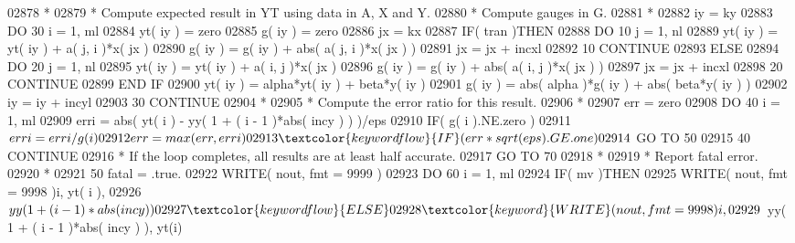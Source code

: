 \begin{DoxyCode}
02878 \textcolor{comment}{*}
02879 \textcolor{comment}{*     Compute expected result in YT using data in A, X and Y.}
02880 \textcolor{comment}{*     Compute gauges in G.}
02881 \textcolor{comment}{*}
02882       iy = ky
02883       \textcolor{keywordflow}{DO} 30 i = 1, ml
02884          yt( iy ) = zero
02885          g( iy ) = zero
02886          jx = kx
02887          \textcolor{keywordflow}{IF}( tran )\textcolor{keywordflow}{THEN}
02888             \textcolor{keywordflow}{DO} 10 j = 1, nl
02889                yt( iy ) = yt( iy ) + a( j, i )*x( jx )
02890                g( iy ) = g( iy ) + abs( a( j, i )*x( jx ) )
02891                jx = jx + incxl
02892    10       \textcolor{keywordflow}{CONTINUE}
02893          \textcolor{keywordflow}{ELSE}
02894             \textcolor{keywordflow}{DO} 20 j = 1, nl
02895                yt( iy ) = yt( iy ) + a( i, j )*x( jx )
02896                g( iy ) = g( iy ) + abs( a( i, j )*x( jx ) )
02897                jx = jx + incxl
02898    20       \textcolor{keywordflow}{CONTINUE}
02899 \textcolor{keywordflow}{         END IF}
02900          yt( iy ) = alpha*yt( iy ) + beta*y( iy )
02901          g( iy ) = abs( alpha )*g( iy ) + abs( beta*y( iy ) )
02902          iy = iy + incyl
02903    30 \textcolor{keywordflow}{CONTINUE}
02904 \textcolor{comment}{*}
02905 \textcolor{comment}{*     Compute the error ratio for this result.}
02906 \textcolor{comment}{*}
02907       err = zero
02908       \textcolor{keywordflow}{DO} 40 i = 1, ml
02909          erri = abs( yt( i ) - yy( 1 + ( i - 1 )*abs( incy ) ) )/eps
02910          \textcolor{keywordflow}{IF}( g( i ).NE.zero )
02911      $      erri = erri/g( i )
02912          err = max( err, erri )
02913          \textcolor{keywordflow}{IF}( err*sqrt( eps ).GE.one )
02914      $      \textcolor{keywordflow}{GO TO} 50
02915    40 \textcolor{keywordflow}{CONTINUE}
02916 \textcolor{comment}{*     If the loop completes, all results are at least half accurate.}
02917       \textcolor{keywordflow}{GO TO} 70
02918 \textcolor{comment}{*}
02919 \textcolor{comment}{*     Report fatal error.}
02920 \textcolor{comment}{*}
02921    50 fatal = .true.
02922       \textcolor{keyword}{WRITE}( nout, fmt = 9999 )
02923       \textcolor{keywordflow}{DO} 60 i = 1, ml
02924          \textcolor{keywordflow}{IF}( mv )\textcolor{keywordflow}{THEN}
02925             \textcolor{keyword}{WRITE}( nout, fmt = 9998 )i, yt( i ),
02926      $         yy( 1 + ( i - 1 )*abs( incy ) )
02927          \textcolor{keywordflow}{ELSE}
02928             \textcolor{keyword}{WRITE}( nout, fmt = 9998 )i, 
02929      $         yy( 1 + ( i - 1 )*abs( incy ) ), yt(i)

\end{DoxyCode}
